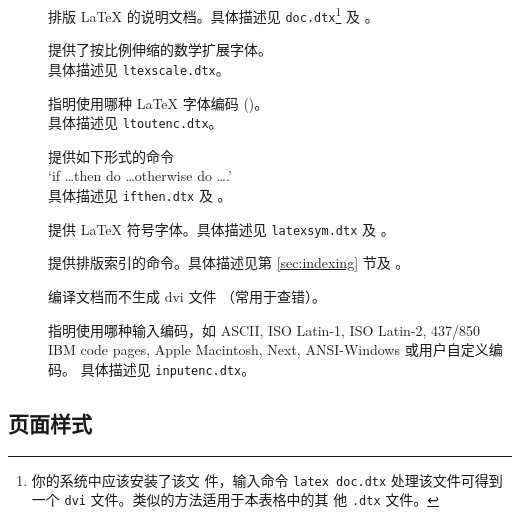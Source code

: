 \begin{table}[btp]
\caption{随 \LaTeX 一起发行的宏包。} \label{packages}
\begin{lined}{\textwidth}
\begin{description}
\item[\normalfont{}] 排版 \LaTeX{} 的说明文档。具体描述见 \texttt{doc.dtx}\footnote{你的系统中应该安装了该文
   件，输入命令 \texttt{latex doc.dtx} 处理该文件可得到一个 \texttt{dvi} 文件。类似的方法适用于本表格中的其
   他 \texttt{.dtx} 文件。} 及 \companion。

\item[\normalfont{}] 提供了按比例伸缩的数学扩展字体。\\
  具体描述见 \texttt{ltexscale.dtx}。

\item[\normalfont{}] 指明使用哪种 \LaTeX{} 字体编码 ()。\\
  具体描述见 \texttt{ltoutenc.dtx}。

\item[\normalfont{}] 提供如下形式的命令\\
  `if \ldots then do \ldots otherwise do \ldots.'\\具体描述见 
  \texttt{ifthen.dtx} 及 \companion。

\item[\normalfont{}]
  提供 \LaTeX{} 符号字体。具体描述见 \texttt{latexsym.dtx} 及 \companion。

\item[\normalfont{}]
  提供排版索引的命令。具体描述见第 \ref{sec:indexing} 节及 \companion。

\item[\normalfont{}] 编译文档而不生成 dvi 文件 （常用于查错）。

\item[\normalfont{}] 指明使用哪种输入编码，如 ASCII, ISO Latin-1, ISO Latin-2, 437/850 IBM
  code pages,  Apple Macintosh, Next,
  ANSI-Windows 或用户自定义编码。
  具体描述见 \texttt{inputenc.dtx}。
\end{description}
\end{lined}
\end{table}

\subsection{页面样式}


